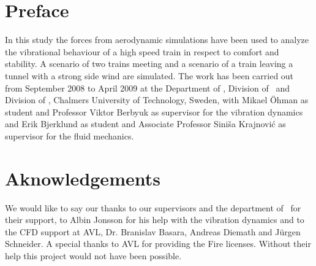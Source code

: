 \section*{Preface}
In this study the forces from aerodynamic simulations have been used to analyze the vibrational behaviour of a high speed train in respect to comfort and stability. A scenario of two trains meeting and a scenario of a train leaving a tunnel with a strong side wind are simulated.
The work has been carried out from September 2008 to April 2009 at the Department of \departmentname, Division of \divisionnameA\ and Division of \divisionnameB, Chalmers University of Technology, Sweden, with Mikael \"Ohman as student and Professor Viktor Berbyuk as supervisor for the vibration dynamics and Erik Bjerklund as student and Associate Professor Sini\v{s}a Krajnovi\'{c} as supervisor for the fluid mechanics.

\section*{Aknowledgements}
We would like to say our thanks to our supervisors and the department of \departmentname\ for their support, to Albin Jonsson for his help with the vibration dynamics and to the CFD support at AVL, Dr. Branislav Basara, Andreas Diemath and J\"urgen Schneider. A special thanks to AVL for providing the Fire licenses.
Without their help this project would not have been possible.